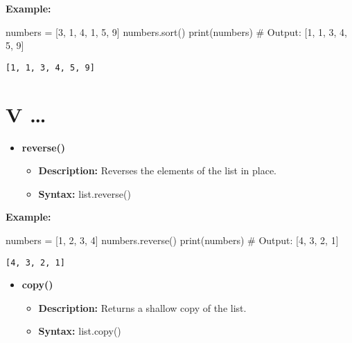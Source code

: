 \documentclass[
  letterpaper,
  DIV=11,
  numbers=noendperiod]{scrreprt}
\newenvironment{Shaded}{\begin{snugshade}}{\end{snugshade}}
\newcommand{\BuiltInTok}[1]{\textcolor[rgb]{0.00,0.23,0.31}{#1}}
\newcommand{\CommentTok}[1]{\textcolor[rgb]{0.37,0.37,0.37}{#1}}
\newcommand{\DecValTok}[1]{\textcolor[rgb]{0.68,0.00,0.00}{#1}}
\newcommand{\NormalTok}[1]{\textcolor[rgb]{0.00,0.23,0.31}{#1}}
\newcommand{\OperatorTok}[1]{\textcolor[rgb]{0.37,0.37,0.37}{#1}}
\providecommand{\tightlist}{%
  \setlength{\itemsep}{0pt}\setlength{\parskip}{0pt}}
\begin{document}
\textbf{Example:}

\begin{Shaded}
\begin{Highlighting}[]
\NormalTok{numbers }\OperatorTok{=}\NormalTok{ [}\DecValTok{3}\NormalTok{, }\DecValTok{1}\NormalTok{, }\DecValTok{4}\NormalTok{, }\DecValTok{1}\NormalTok{, }\DecValTok{5}\NormalTok{, }\DecValTok{9}\NormalTok{]}
\NormalTok{numbers.sort()}
\BuiltInTok{print}\NormalTok{(numbers)  }\CommentTok{\# Output: [1, 1, 3, 4, 5, 9]}
\end{Highlighting}
\end{Shaded}

\begin{verbatim}
[1, 1, 3, 4, 5, 9]
\end{verbatim}

\section{V \ldots{}}

\begin{itemize}
\tightlist
\item
  \textbf{reverse()}

  \begin{itemize}
  \tightlist
  \item
    \textbf{Description:} Reverses the elements of the list in place.
  \item
    \textbf{Syntax:} list.reverse()
  \end{itemize}
\end{itemize}

\textbf{Example:}

\begin{Shaded}
\begin{Highlighting}[]
\NormalTok{numbers }\OperatorTok{=}\NormalTok{ [}\DecValTok{1}\NormalTok{, }\DecValTok{2}\NormalTok{, }\DecValTok{3}\NormalTok{, }\DecValTok{4}\NormalTok{]}
\NormalTok{numbers.reverse()}
\BuiltInTok{print}\NormalTok{(numbers)  }\CommentTok{\# Output: [4, 3, 2, 1]}
\end{Highlighting}
\end{Shaded}

\begin{verbatim}
[4, 3, 2, 1]
\end{verbatim}

\begin{itemize}
\tightlist
\item
  \textbf{copy()}

  \begin{itemize}
  \tightlist
  \item
    \textbf{Description:} Returns a shallow copy of the list.
  \item
    \textbf{Syntax:} list.copy()
  \end{itemize}
\end{itemize}
\end{document}
